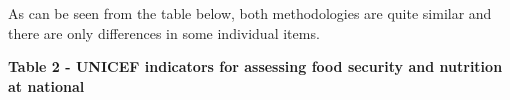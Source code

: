 {%
% 
% 
% 
% 
% 
% 
% 
% 
% 
% 
% 
% 
% 
% 
% 
% 
% 
% 
% 
% 
% 
% 
% 
% 
% 
% 
% 
% 
% 
% 
% 
% 

As can be seen from the table below, both methodologies are quite
similar and there are only differences in some individual items.

{\bfseries Table 2 - UNICEF indicators for assessing food security and
nutrition at national}

}
